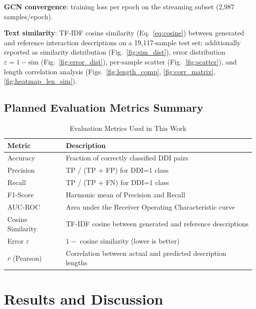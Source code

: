 \documentclass[conference]{IEEEtran}
\begin{document}
\textbf{GCN convergence}: training loss per epoch on the streaming subset (2,987 samples/epoch).

\textbf{Text similarity}: TF-IDF cosine similarity (Eq.~\ref{eq:cosine}) between generated
and reference interaction descriptions on a 19,117-sample test set; additionally reported
as similarity distribution (Fig.~\ref{fig:sim_dist}), error distribution
$\varepsilon = 1-\mathrm{sim}$ (Fig.~\ref{fig:error_dist}), per-sample scatter
(Fig.~\ref{fig:scatter}), and length correlation analysis (Figs.~\ref{fig:length_comp},
\ref{fig:corr_matrix}, \ref{fig:heatmap_len_sim}).

\subsection{Planned Evaluation Metrics Summary}

\begin{table}[t]
\centering
\caption{Evaluation Metrics Used in This Work}
\label{tab:metrics}
\begin{tabular}{p{2.2cm} p{4.8cm}}
\toprule
\textbf{Metric} & \textbf{Description} \\
\midrule
Accuracy          & Fraction of correctly classified DDI pairs \\
Precision         & TP / (TP + FP) for DDI=1 class \\
Recall            & TP / (TP + FN) for DDI=1 class \\
F1-Score          & Harmonic mean of Precision and Recall \\
AUC-ROC           & Area under the Receiver Operating Characteristic curve \\
Cosine Similarity & TF-IDF cosine between generated and reference descriptions \\
Error $\varepsilon$ & $1 -$ cosine similarity (lower is better) \\
$r$ (Pearson)     & Correlation between actual and predicted description lengths \\
\bottomrule
\end{tabular}
\end{table}

\section{Results and Discussion}
\label{sec:results}
\end{document}
